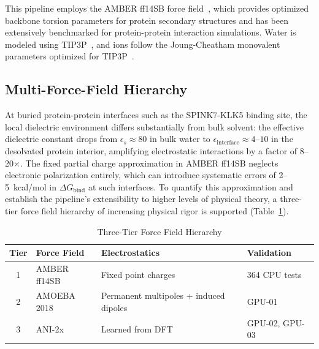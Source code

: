 \documentclass[conference]{IEEEtran}
\begin{document}
This pipeline employs the AMBER ff14SB force field~\cite{maier2015}, which
provides optimized backbone torsion parameters for protein secondary
structures and has been extensively benchmarked for protein-protein
interaction simulations.  Water is modeled using TIP3P~\cite{jorgensen1983},
and ions follow the Joung-Cheatham monovalent parameters optimized for
TIP3P~\cite{joung2008}.

\subsection{Multi-Force-Field Hierarchy}\label{sec:multi_ff}

At buried protein-protein interfaces such as the SPINK7-KLK5 binding site,
the local dielectric environment differs substantially from bulk solvent:
the effective dielectric constant drops from $\epsilon_s \approx 80$ in
bulk water to $\epsilon_{\mathrm{interface}} \approx 4$--$10$ in the
desolvated protein interior, amplifying electrostatic interactions by a
factor of 8--20$\times$.  The fixed partial charge approximation in AMBER
ff14SB neglects electronic polarization entirely, which can introduce
systematic errors of 2--5~kcal/mol in $\Delta G_{\mathrm{bind}}$ at such
interfaces.  To quantify this approximation and establish the pipeline's
extensibility to higher levels of physical theory, a three-tier force field
hierarchy of increasing physical rigor is supported
(Table~\ref{tab:ff_tiers}).

\begin{table}[H]
  \centering
  \caption{Three-Tier Force Field Hierarchy}
  \label{tab:ff_tiers}
  \small
  \begin{tabularx}{\columnwidth}{@{}cl>{\raggedright\arraybackslash}Xl@{}}
    \toprule
    \textbf{Tier} & \textbf{Force Field} & \textbf{Electrostatics} & \textbf{Validation} \\
    \midrule
    1 & AMBER ff14SB & Fixed point charges & 364 CPU tests \\
    2 & AMOEBA 2018 & Permanent multipoles + induced dipoles & GPU-01 \\
    3 & ANI-2x & Learned from DFT & GPU-02, GPU-03 \\
    \bottomrule
  \end{tabularx}
\end{table}
\end{document}
